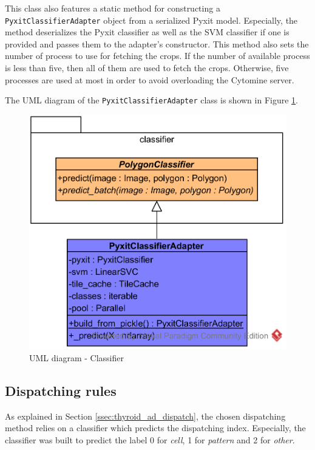 This class also features a static method for constructing a \texttt{PyxitClassifierAdapter} object from a serialized Pyxit model. Especially, the method deserializes the Pyxit classifier as well as the SVM classifier if one is provided and passes them to the adapter's constructor. This method also sets the number of process to use for fetching the crops. If the number of available process is less than five, then all of them are used to fetch the crops. Otherwise, five processes are used at most in order to avoid overloading the Cytomine server.

The UML diagram of the \texttt{PyxitClassifierAdapter} class is shown in Figure \ref{fig:uml_cyto_classifiers}.

\begin{figure}
	\center
	\includegraphics[scale=0.85]{image/thyroid_classifiers.png}
	\caption{UML diagram - Classifier}
	\label{fig:uml_cyto_classifiers}
\end{figure}

\subsection{Dispatching rules}

As explained in Section \ref{ssec:thyroid_ad_dispatch}, the chosen dispatching method relies on a classifier which predicts the dispatching index. Especially, the classifier was built to predict the label 0 for \textit{cell}, 1 for \textit{pattern} and 2 for \textit{other}.

